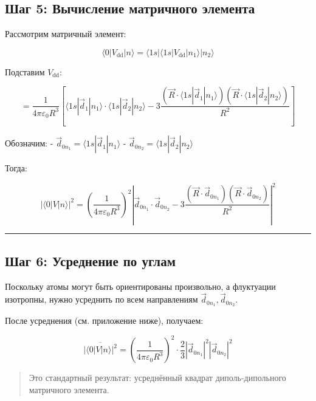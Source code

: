 \documentclass[11pt]{article}
\begin{document}
\subsection{Шаг 5: Вычисление матричного
элемента}\label{ux448ux430ux433-5-ux432ux44bux447ux438ux441ux43bux435ux43dux438ux435-ux43cux430ux442ux440ux438ux447ux43dux43eux433ux43e-ux44dux43bux435ux43cux435ux43dux442ux430}

Рассмотрим матричный элемент:

\[
\langle 0 | V_{\text{dd}} | n \rangle = \langle 1s| \langle 1s| V_{\text{dd}} |n_1\rangle |n_2\rangle
\]

Подставим \(V_{\text{dd}}\):

\[
= \frac{1}{4\pi\varepsilon_0 R^3} \left[
\langle 1s| \vec{d}_1 |n_1\rangle \cdot \langle 1s| \vec{d}_2 |n_2\rangle - 3 \frac{(\vec{R} \cdot \langle 1s| \vec{d}_1 |n_1\rangle)(\vec{R} \cdot \langle 1s| \vec{d}_2 |n_2\rangle)}{R^2}
\right]
\]

Обозначим: - \(\vec{d}_{0n_1} = \langle 1s| \vec{d}_1 |n_1\rangle\) -
\(\vec{d}_{0n_2} = \langle 1s| \vec{d}_2 |n_2\rangle\)

Тогда:

\[
|\langle 0 | V | n \rangle|^2 = \left( \frac{1}{4\pi\varepsilon_0 R^3} \right)^2 \left| \vec{d}_{0n_1} \cdot \vec{d}_{0n_2} - 3 \frac{(\vec{R} \cdot \vec{d}_{0n_1})(\vec{R} \cdot \vec{d}_{0n_2})}{R^2} \right|^2
\]

\begin{center}\rule{0.5\linewidth}{\linethickness}\end{center}

\subsection{Шаг 6: Усреднение по
углам}\label{ux448ux430ux433-6-ux443ux441ux440ux435ux434ux43dux435ux43dux438ux435-ux43fux43e-ux443ux433ux43bux430ux43c}

Поскольку атомы могут быть ориентированы произвольно, а флуктуации
изотропны, нужно усреднить по всем направлениям
\(\vec{d}_{0n_1}, \vec{d}_{0n_2}\).

После усреднения (см. приложение ниже), получаем:

\[
\overline{ |\langle 0 | V | n \rangle|^2 } = \left( \frac{1}{4\pi\varepsilon_0 R^3} \right)^2 \cdot \frac{2}{3} |\vec{d}_{0n_1}|^2 |\vec{d}_{0n_2}|^2
\]

\begin{quote}
Это стандартный результат: усреднённый квадрат диполь-дипольного
матричного элемента.
\end{quote}
\end{document}
